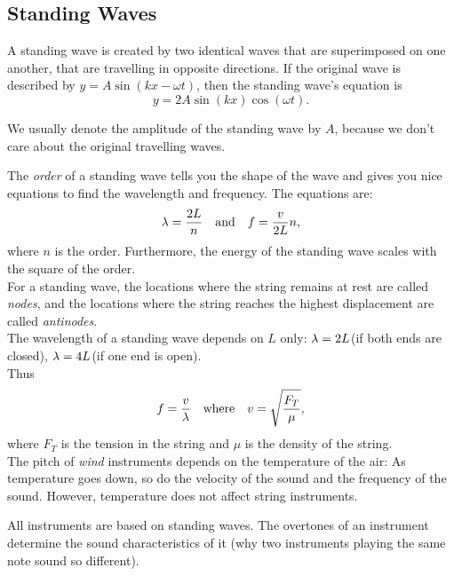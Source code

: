 \documentclass[class=article, crop=false]{standalone}
\begin{document}
  \subsection{Standing Waves}
  A standing wave is created by two identical waves that are superimposed on one another, that are travelling in opposite directions. If the original wave is described by $y = A\sin (kx - \omega t)$, then the standing wave's equation is
  \[
    y = 2A\sin(kx)\cos(\omega t).
  \]
  \begin{note}{}
    We usually denote the amplitude of the standing wave by $A$, because we don't care about the original travelling waves.
  \end{note}
  The \emph{order} of a standing wave tells you the shape of the wave and gives you nice equations to find the wavelength and frequency. The equations are:
  \[
    \lambda = \frac{2L}{n} \quad \text{and}\quad f = \frac{v}{2L}n,
  \]
  where $n$ is the order. Furthermore, the energy of the standing wave scales with the square of the order. \\[10pt]
  For a standing wave, the locations where the string remains at rest are called \emph{nodes}, and the locations where the string reaches the highest displacement are called \emph{antinodes}. \\[10pt]
  The wavelength of a standing wave depends on $L$ only: $\lambda=2L$(if both ends are closed), $\lambda=4L$(if one end is open).\\[10pt]
  Thus
  \[
    f=\frac{v}{\lambda} \quad\text{where}\quad v=\sqrt{\frac{F_T}{\mu}},
  \]
  where $F_T$ is the tension in the string and $\mu$ is the density of the string.\\[10pt]
  The pitch of \emph{wind} instruments depends on the temperature of the air: As temperature goes down, so do the velocity of the sound and the frequency of the sound. However, temperature does not affect string instruments.
  \begin{note}{}
    All instruments are based on standing waves. The overtones of an instrument determine the sound characteristics of it (why two instruments playing the same note sound so different).
  \end{note}
\end{document}
